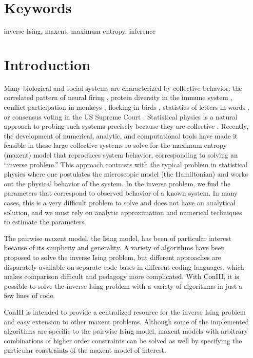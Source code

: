 \documentclass{jors}
\begin{document}
\section*{Keywords}
inverse Ising, maxent, maximum entropy, inference

\section*{Introduction}
Many biological and social systems are characterized by collective behavior: the correlated pattern of neural firing \cite{Schneidman:2006he}, protein diversity in the immune system \cite{Mora:2010jxb}, conflict participation in monkeys \cite{Daniels:2017cq}, flocking in birds \cite{Bialek:2012cs}, statistics of letters in words \cite{Stephens:2010hi}, or consensus voting in the US Supreme Court \cite{Lee:2015ev,Lee:ky}. Statistical physics is a natural approach to probing such systems precisely because they are collective \cite{Castellano:2009ce}.
Recently, the development of numerical, analytic, and computational tools have made it feasible in these large collective systems to solve for the maximum entropy (maxent) model that reproduces system behavior, corresponding to solving an ``inverse problem.''
This approach contrasts with the typical problem in statistical physics where one postulates the microscopic model (the Hamiltonian) and works out the physical behavior of the system. In the inverse problem, we  find the parameters that correspond to observed behavior of a known system. In many cases, this is a very difficult problem to solve and does not have an analytical solution, and we must rely on analytic approximation and numerical techniques to estimate the parameters.

The pairwise maxent model, the Ising model, has been of particular interest because of its simplicity and generality. A variety of algorithms have been proposed to solve the inverse Ising problem, but different approaches are disparately available on separate code bases in different coding languages, which makes comparison difficult and pedagogy more complicated. With ConIII, it is possible to solve the inverse Ising problem with a variety of algorithms in just a few lines of code. 

ConIII is intended to provide a centralized resource for the inverse Ising problem and easy extension to other maxent problems. Although some of the implemented algorithms are specific to the pairwise Ising model, maxent models with arbitrary combinations of higher order constraints can be solved as well by specifying the particular constraints of the maxent model of interest. 
\end{document}
